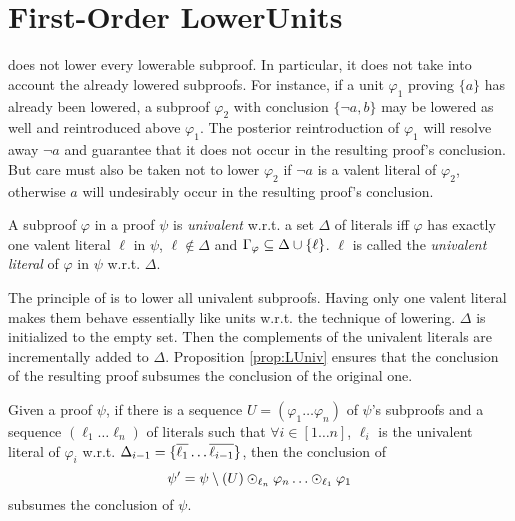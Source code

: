 \documentclass{llncs}
\begin{document}
\section{First-Order LowerUnits} \label{sec:FOLU}

{\LowerUnits} does not lower every lowerable subproof. In particular, it does not take into
account the already lowered subproofs. For instance, if a unit $\varphi_1$ proving $\{a\}$ has
already been lowered, a subproof $\varphi_2$ with conclusion $\{\neg a, b\}$ may be lowered as well and
reintroduced above $\varphi_1$. The posterior reintroduction of $\varphi_1$ will resolve away $\neg a$ and guarantee that it does not occur in the resulting proof's conclusion. But care must also be taken not to lower $\varphi_2$ if $\neg a$ is a valent literal of
$\varphi_2$, otherwise $a$ will undesirably occur in the resulting proof's conclusion.

\begin{definition}
A subproof $\varphi$ in a proof $\psi$ is \emph{univalent} w.r.t. a set $\Delta$ of literals iff
$\varphi$ has exactly one valent literal $\ell$ in $\psi$, $\ell \notin \Delta$ and
$\Gamma_{\varphi} \subseteq \Delta \cup \left\{ \ell \right\}$. $\ell$ is called the \emph{univalent
literal} of $\varphi$ in $\psi$ w.r.t.  $\Delta$.
\end{definition}

The principle of {\LowerUnivalents} is to lower all univalent subproofs. Having only one valent literal makes them behave essentially like units w.r.t. the technique of lowering. $\Delta$ is
initialized to the empty set. Then the complements of the univalent literals are incrementally added to
$\Delta$. Proposition \ref{prop:LUniv} ensures that the conclusion of the resulting proof
subsumes the conclusion of the original one.

\begin{proposition} \label{prop:LUniv}
Given a proof $\psi$, if 
there is a sequence $U = (\varphi_1 \ldots \varphi_n)$
of $\psi$'s subproofs and a sequence $(\ell_1 \ldots \ell_n)$ of literals such that $\forall i \in
[1 \ldots n]$, $\ell_i$ is the univalent literal of $\varphi_i$ w.r.t. $\Delta_{i-1} =
\{\overline{\ell_1} \ldots \overline{\ell_{i-1}}\}$, then the conclusion of $$ \psi' = \psi \setminus (U)
\odot_{\ell_n} \varphi_n \ldots \odot_{\ell_1} \varphi_1 $$ subsumes the conclusion of $\psi$.
\end{proposition}
\end{document}
